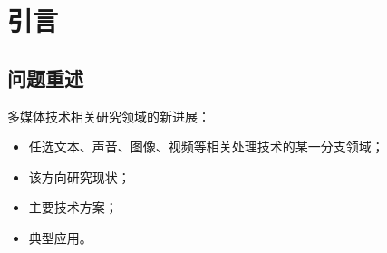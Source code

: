 \documentclass[../main]{subfiles}
\begin{document}
\chapter{引言}%
\label{cha:introduction}

\section{问题重述}%
\label{sec:problem}

\begin{Exercise}
  多媒体技术相关研究领域的新进展\cite{larson2010introduction}：

  \begin{itemize}
    \item 任选文本、声音、图像、视频等相关处理技术的某一分支领域；
    \item 该方向研究现状；
    \item 主要技术方案；
    \item 典型应用。
  \end{itemize}
\end{Exercise}
\end{document}

